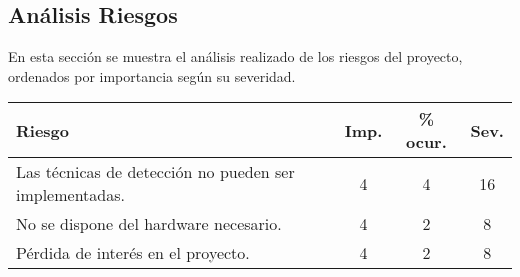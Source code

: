 \subsection*{Análisis Riesgos}
En esta sección se muestra el análisis realizado de los riesgos del proyecto, ordenados por importancia según su severidad. \\

\begin{tabular}{|l||c|c|c|}
	
	\hline
	Riesgo & Imp. & \% ocur. & Sev. \\
	\hline
	Las técnicas de detección no pueden ser implementadas.  & 4 & 4 & 16 \\
	No se dispone del hardware necesario. & 4 & 2 & 8 \\
	Pérdida de interés en el proyecto. & 4 & 2 & 8 \\
	\hline
	
\end{tabular}

